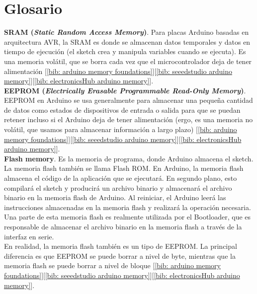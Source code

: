 \documentclass[12pt]{article}
\begin{document}
	\pagebreak
	
	\section*{Glosario}
	\label{glosario}
	
	\noindent \textbf{\large SRAM (\textit{Static Random Access Memory})}. Para placas Arduino basadas en arquitectura AVR, la SRAM es donde se almacenan datos temporales y datos en tiempo de ejecución (el sketch crea y manipula variables cuando se ejecuta). Es una memoria volátil, que se borra cada vez que el microcontrolador deja de tener alimentación [\ref{bib: arduino memory foundations}][\ref{bib: seeedstudio arduino memory}][\ref{bib: electronicsHub arduino memory}].\\
	
	\noindent \textbf{\large EEPROM (\textit{Electrically Erasable Programmable Read-Only Memory})}. EEPROM en Arduino se usa generalmente para almacenar una pequeña cantidad de datos como estados de dispositivos de entrada o salida para que se puedan retener incluso si el Arduino deja de tener alimentación (ergo, es una memoria no volátil, que usamos para almacenar información a largo plazo) [\ref{bib: arduino memory foundations}][\ref{bib: seeedstudio arduino memory}][\ref{bib: electronicsHub arduino memory}].  \\
	
	\noindent \textbf{\large Flash memory}. Es la memoria de programa, donde Arduino almacena el sketch. La memoria flash también se llama Flash ROM. En Arduino, la memoria flash almacena el código de la aplicación que se ejecutará. En segundo plano, esto compilará el sketch y producirá un archivo binario y almacenará el archivo binario en la memoria flash de Arduino. Al reiniciar, el Arduino leerá las instrucciones almacenadas en la memoria flash y realizará la operación necesaria. Una parte de esta memoria flash es realmente utilizada por el Bootloader, que es responsable de almacenar el archivo binario en la memoria flash a través de la interfaz en serie.\\
	\noindent En realidad, la memoria flash también es un tipo de EEPROM. La principal diferencia es que EEPROM se puede borrar a nivel de byte, mientras que la memoria flash se puede borrar a nivel de bloque [\ref{bib: arduino memory foundations}][\ref{bib: seeedstudio arduino memory}][\ref{bib: electronicsHub arduino memory}]. \\
	
\end{document}
